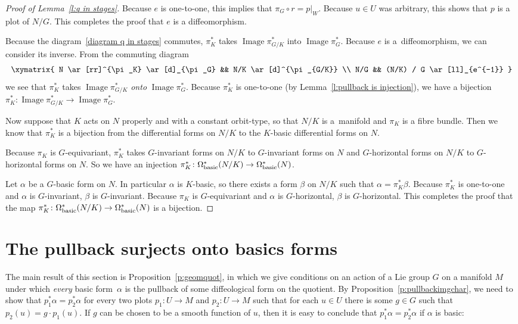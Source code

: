 \documentclass[pdftex]{sigma}
\numberwithin{equation}{section}
\DeclareMathOperator {\image}{Image}
\newcommand{\hypref}[2]{{#2~\ref{#1}}}
\begin{document}
\begin{proof}[Proof of Lemma~\ref{l:q in stages}]
Because $e$ is one-to-one, this implies that $\pi_G \circ r = p|_W$.
Because $u \in U$ was arbitrary, this shows that $p$ is a plot of $N/G$.
This completes the proof that $e$ is a dif\/feomorphism.

Because the diagram~\eqref{diagram q in stages} commutes, $\pi_K^*$
takes $\image \pi_{G/K}^*$ into $\image \pi_G^*$.
Because $e$ is a~dif\/feomorphism, we can consider its inverse.
From the commuting diagram
\begin{gather*} \xymatrix{
 N \ar[rr]^{\pi_K} \ar[d]_{\pi_G} && N/K \ar[d]^{\pi_{G/K}} \\
  N/G &&   (N/K) / G \ar[ll]_{e^{-1}}
} \end{gather*}
we see that $\pi_K^*$ takes $\image \pi_{G/K}^*$ \emph{onto} $\image \pi_G^*$.
Because $\pi_K^*$ is one-to-one (by \hypref{l:pullback is injection}{Lemma}),
we have a bijection
$\pi_K^* \colon \image \pi_{G/K}^* \to \image \pi_G^*$.

Now suppose that $K$ acts on $N$ properly and with a constant orbit-type,
so that $N/K$ is a~mani\-fold and $\pi_K$ is a f\/ibre bundle.
Then we know that $\pi_K^*$ is a bijection from the dif\/ferential forms
on $N/K$ to the $K$-basic dif\/ferential forms on $N$.

Because $\pi_K$ is $G$-equivariant,
$\pi_K^*$ takes $G$-invariant forms on $N/K$
to $G$-invariant forms on $N$
and $G$-horizontal forms on $N/K$ to $G$-horizontal forms on $N$.
So we have an injection
$\pi_K^* \colon \Omega^*_{\rm basic}(N/K) \to \Omega^*_{\rm basic}(N)$.

Let $\alpha$ be a $G$-basic form on $N$. In particular $\alpha$ is $K$-basic,
so there exists a form $\beta$ on $N/K$ such that $\alpha = \pi_K^* \beta$.
Because $\pi_K^*$ is one-to-one and $\alpha$ is $G$-invariant,
$\beta$ is $G$-invariant.
Because $\pi_K$ is $G$-equivariant and $\alpha$ is $G$-horizontal,
$\beta$ is $G$-horizontal.
This completes the proof that the map
$\pi_K^* \colon \Omega^*_{\rm basic}(N/K) \to \Omega^*_{\rm basic}(N)$
is a bijection.
\end{proof}

\section{The pullback surjects onto basics forms} \label{sec:surjects}

The main result of this section is Proposition~\ref{p:geomquot},
in which we give conditions on an action of a Lie group $G$ on a manifold $M$
under which \emph{every} basic form~$\alpha$ is the pullback
of some dif\/feological form on the quotient.
By \hypref{p:pullbackimgchar}{Proposition},
we need to show that $p_1^*\alpha = p_2^*\alpha$ for every two plots
$p_1 \colon U \to M$ and $p_2 \colon U \to M$
such that
for each $u\in U$ there is some $g \in G$ such that $p_2(u) = g \cdot p_1(u)$.
If $g$ can be chosen to be a smooth function of $u$,
then it is easy to conclude that $p_1^*\alpha = p_2^*\alpha$
if $\alpha$ is basic:
\end{document}
